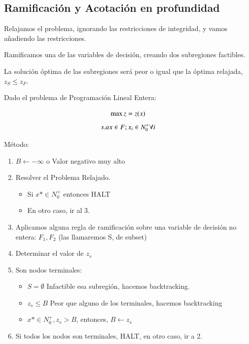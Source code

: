 \documentclass[12pt, twoside, openright]{report} %
\begin{document}
\subsection{Ramificación y Acotación en profundidad}

Relajamos el problema, ignorando las restricciones de integridad, y
vamos añadiendo las restricciones.

Ramificamos una de las variables de decisión, creando dos
subregiones factibles.

La solución óptima de las subregiones será peor o igual que la óptima
relajada, \(z_S \leq z_F\).

Dado el problema de Programación Lineal Entera:
\vspace{-0.5cm}

$$\max \space z= z(x)$$
\vspace{-1cm}
$$s.a \space x \in F; x_i \in N^+_0 \space \forall i$$

Método:
\vspace{-0.5cm}

\begin{enumerate}
	\item $B ← -\infty$ o Valor negativo muy alto
	\item Resolver el Problema Relajado.

	      \begin{itemize}
		      \vspace{-0.5cm}
		      \item Si \(x* \in N^+_0\) entonces HALT
		      \item En otro caso, ir al 3.
	      \end{itemize}
	\item Aplicamos alguna regla de ramificación sobre una variable de
	      decisión no entera: \(F_1, F_2\) (las llamaremos S, de subset)
	\item Determinar el valor de \(z_s\)
	\item Son nodos terminales:
	      \vspace{-0.5cm}

	      \begin{itemize}
		      \item \(S= \emptyset\) Infactible esa subregión, hacemos backtracking.
		      \item \(z_s \leq B\) Peor que alguno de los terminales, hacemos
		            backtracking
		      \item \(x* \in N^+_0 , z_s > B\), entonces, \(B←z_s\)
	      \end{itemize}
	\item Si todos los nodos son terminales, HALT, en otro caso, ir a 2.
\end{enumerate}
\pagebreak
\end{document}
